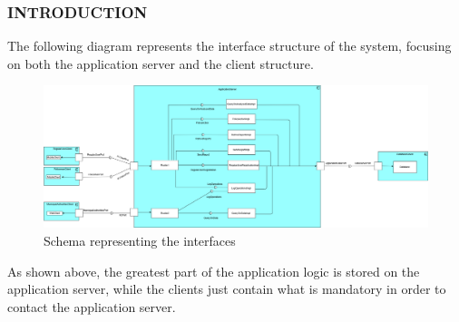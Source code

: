 \subsubsection{INTRODUCTION}
The following diagram represents the interface structure of the system, focusing on both the application server and the client structure. \newline
\begin{figure}[h!]
	\centering
	\includegraphics[width=\textwidth]{Images/component_diagram_beta}
	\caption{Schema representing the interfaces}
\end{figure}

As shown above, the greatest part of the application logic is stored on the application server, while the clients just contain what is mandatory in order to contact the application server.
